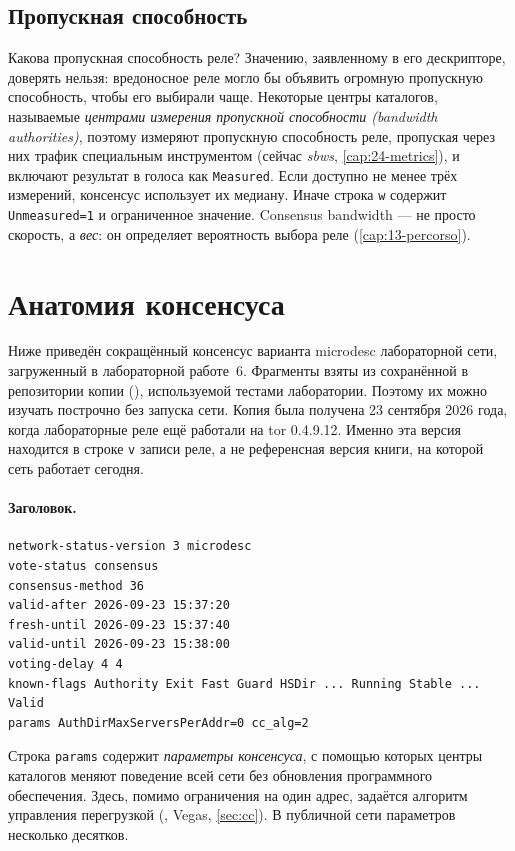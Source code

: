\subsection{Пропускная способность}

Какова пропускная способность реле? Значению, заявленному в его дескрипторе, доверять нельзя: вредоносное реле могло бы объявить огромную пропускную способность, чтобы его выбирали чаще. Некоторые центры каталогов, называемые \emph{центрами измерения пропускной способности (bandwidth authorities)}, поэтому измеряют пропускную способность реле, пропуская через них трафик специальным инструментом (сейчас \emph{sbws}, \cref{cap:24-metrics}), и включают результат в голоса как \texttt{Measured}. Если доступно не менее трёх измерений, консенсус использует их медиану. Иначе строка \texttt{w} содержит \texttt{Unmeasured=1} и ограниченное значение. Consensus bandwidth --- не просто скорость, а \emph{вес}: он определяет вероятность выбора реле (\cref{cap:13-percorso}).

\section{Анатомия консенсуса}\label{sec:dir-anatomia}

Ниже приведён сокращённый консенсус варианта microdesc лабораторной сети, загруженный в лабораторной работе~6. Фрагменты взяты из сохранённой в репозитории копии (), используемой тестами лаборатории. Поэтому их можно изучать построчно без запуска сети. Копия была получена 23 сентября 2026 года, когда лабораторные реле ещё работали на tor 0.4.9.12. Именно эта версия находится в строке \texttt{v} записи реле, а не референсная версия книги, на которой сеть работает сегодня.

\paragraph{Заголовок.}
\begin{lstlisting}[numbers=none]
network-status-version 3 microdesc
vote-status consensus
consensus-method 36
valid-after 2026-09-23 15:37:20
fresh-until 2026-09-23 15:37:40
valid-until 2026-09-23 15:38:00
voting-delay 4 4
known-flags Authority Exit Fast Guard HSDir ... Running Stable ... Valid
params AuthDirMaxServersPerAddr=0 cc_alg=2
\end{lstlisting}
Строка \texttt{params} содержит \emph{параметры консенсуса}, с помощью которых центры каталогов меняют поведение всей сети без обновления программного обеспечения. Здесь, помимо ограничения на один адрес, задаётся алгоритм управления перегрузкой (, Vegas, \cref{sec:cc}). В публичной сети параметров несколько десятков.

